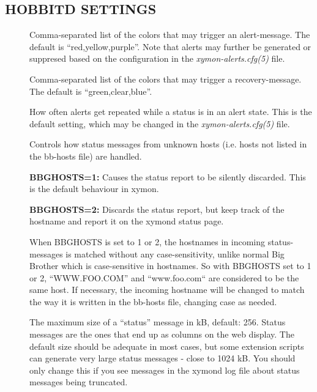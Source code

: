 \subsection{HOBBITD SETTINGS}


\begin{description}

\item[] Comma-separated list of the colors that may
  trigger an alert-message. The default is ``red,yellow,purple''. Note
  that alerts may further be generated or suppresed based on the
  configuration in the \emph{xymon-alerts.cfg(5)} file. 

 

\item[] Comma-separated list of the colors that may
  trigger a recovery-message. The default is ``green,clear,blue''. 


 

\item[] How often alerts get repeated while a
  status is in an alert state. This is the default setting, which may
  be changed in the \emph{xymon-alerts.cfg(5)} file. 


 

\item[] Controls how status messages from unknown
  hosts (i.e. hosts not listed in the bb-hosts file) are handled. 


 \textbf{BBGHOSTS=1:} Causes the status report to be silently
 discarded. This is the default behaviour in xymon. 



 \textbf{BBGHOSTS=2:}
 Discards the status report, but keep track of the hostname and report
 it on the xymond status page. 



  When BBGHOSTS is set to 1 or 2, the hostnames in incoming
  status-messages is matched without any case-sensitivity, unlike
  normal Big Brother which is case-sensitive in hostnames. So with
  BBGHOSTS set to 1 or 2, ``WWW.FOO.COM'' and ``www.foo.com`` are
  considered to be the same host. If necessary, the incoming hostname
  will be changed to match the way it is written in the bb-hosts file,
  changing case as needed. 



 

\item[] The maximum size of a ``status'' message
  in kB, default: 256. Status messages are the ones that end up as
  columns on the web display. The default size should be adequate in
  most cases, but some extension scripts can generate very large
  status messages - close to 1024 kB. You should only change this if
  you see messages in the xymond log file about status messages being
  truncated. 



\end{description}
